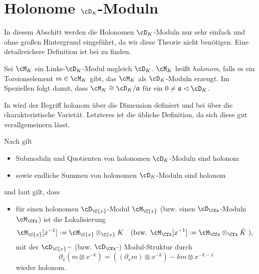 \section{Holonome $\cD_K$-Moduln}
In diesem Abschitt werden die Holonomen $\cD_K$-Moduln nur sehr einfach und
ohne großen Hintergrund eingeführt, da wir diese Theorie nicht benötigen. Eine
detailreichere Definition ist bei \cite[Def. 3.3.1]{sabbah_cimpa90} zu finden.
\begin{defn}
Sei $\cM_K$ ein Links-$\cD_K$-Modul ungleich $\cD_K$. $\cM_K$ heißt
\emph{holonom}, falls es ein Torsionselement $m\in\cM_K$ gibt, das $\cM_K$ als
$\cD_K$-Moduln erzeugt. Im Speziellen folgt damit, dass $\cM_K\cong
\cD_K/\mathfrak{a}$ für ein $0\neq\mathfrak{a}\vartriangleleft\cD_K$.
\end{defn}
\begin{bem}
\begin{comment}
Dies hier ist eine sehr vereinfachte, aber für unsere Zwecke völlig
ausreichende, Definition von holonom.
\end{comment}
In \cite{coutinho1995primer} wird der Begriff holonom über die Dimension
definiert und bei \cite{sabbah_cimpa90} über die charakteristische Varietät.
Letzteres ist die übliche Definition, da sich diese gut verallgemeinern lässt.
\end{bem}

\begin{bem} 
Nach \cite[Prop 10.1.1]{coutinho1995primer} gilt
\begin{itemize}
\item Submoduln und Quotienten von holonomen $\cD_K$-Moduln sind holonom
\item sowie endliche Summen von holonomen $\cD_K$-Moduln sind holonom
\end{itemize}
und laut \cite[Thm. 4.2.3]{sabbah_cimpa90} gilt, dass
\begin{itemize}
\item für einen holonomen $\cD_{\C\{x\}}$-Modul $\cM_{\C\{x\}}$
(bzw. einen $\cD_{\Cfx}$-Moduln $\cM_{\Cfx}$)
ist die Lokalisierung
\begin{align*}
\cM_{\C\{x\}}[x^{-1}]&:=\cM_{\C\{x\}}\otimes_{\C\{x\}}K
&&\text{(bzw. }\cM_{\Cfx}[x^{-1}]:=\cM_{\Cfx}\otimes_{\Cfx}\hat K\text{ ),}
\end{align*}
mit der $\cD_{\C\{x\}}-$ (bzw. $\cD_{\Cfx}$-) Modul-Struktur durch
\[
\partial_x(m\otimes x^{-k})=((\partial_xm)\otimes x^{-k})-km\otimes x^{-k-1}
\]
wieder holonom.
\end{itemize}
\end{bem}

